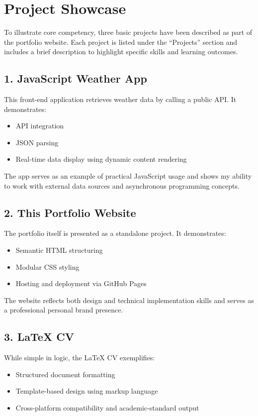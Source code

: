 \documentclass[11pt,a4paper]{article}
\begin{document}
\section*{Project Showcase}

To illustrate core competency, three basic projects have been described as part of the portfolio website. Each project is listed under the “Projects” section and includes a brief description to highlight specific skills and learning outcomes.

\subsection*{1. JavaScript Weather App}

This front-end application retrieves weather data by calling a public API. It demonstrates:
\begin{itemize}
    \item API integration
    \item JSON parsing
    \item Real-time data display using dynamic content rendering
\end{itemize}

The app serves as an example of practical JavaScript usage and shows my ability to work with external data sources and asynchronous programming concepts.

\subsection*{2. This Portfolio Website}

The portfolio itself is presented as a standalone project. It demonstrates:
\begin{itemize}
    \item Semantic HTML structuring
    \item Modular CSS styling
    \item Hosting and deployment via GitHub Pages
\end{itemize}

The website reflects both design and technical implementation skills and serves as a professional personal brand presence.

\subsection*{3. LaTeX CV}

While simple in logic, the LaTeX CV exemplifies:
\begin{itemize}
    \item Structured document formatting
    \item Template-based design using markup language
    \item Cross-platform compatibility and academic-standard output
\end{itemize}
\end{document}
